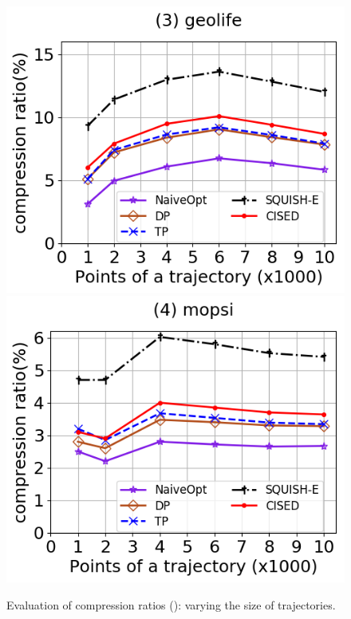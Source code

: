 \begin{figure}[tb!]
	\includegraphics[scale=0.315]{Figures/Exp-SED-CR-size-geolife.png}	\hspace{1ex}
	\includegraphics[scale=0.315]{Figures/Exp-SED-CR-size-mopsi.png}		
	\vspace{-3ex}

	\caption{\small Evaluation of compression ratios (\sed): varying the size of
    trajectories.}
  \label{fig:cr-sed-size}
	\vspace{-2ex}
\end{figure}

